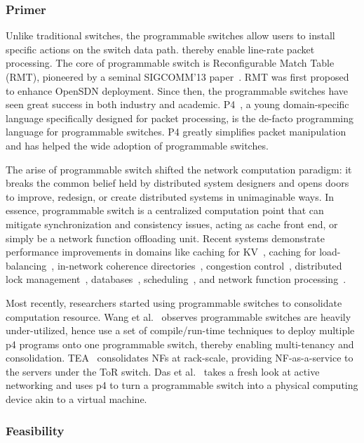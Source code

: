 \subsubsection{Primer}
Unlike traditional switches, the programmable switches
allow users to install specific actions on the switch data path.
thereby enable line-rate packet processing.
The core of programmable switch is Reconfigurable Match Table (RMT),
pioneered by a seminal SIGCOMM'13 paper~\cite{RMT-SIGCOMM13}.
RMT was first proposed to enhance OpenSDN deployment.
Since then, the programmable switches have seen great success in both industry and academic. 
P4~\cite{p4-paper}, a young domain-specific language specifically designed for packet processing, is the de-facto programming language for programmable switches. P4 greatly simplifies
packet manipulation and has helped the wide adoption of programmable switches.

The arise of programmable switch shifted the network computation paradigm:
it breaks the common belief held by distributed system designers
and opens doors to improve, redesign, or create distributed systems in unimaginable ways.
In essence, programmable switch is a centralized computation point
that can mitigate synchronization and consistency issues,
acting as cache front end, or simply be a network function offloading unit. 
Recent systems demonstrate performance improvements in domains like
caching for KV~\cite{netcache-sosp17, incbricks-asplos17},
caching for load-balancing~\cite{distcache-fast19},
in-network coherence directories~\cite{pegasus-osdi20},
congestion control~\cite{hpcc-sigcomm19},
distributed lock management~\cite{netlock-sigcomm20},
databases~\cite{cheetah-sigmod20},
scheduling~\cite{racksched-osdi20},
and network function processing~\cite{tea-sigcomm20}.

Most recently, researchers started using programmable switches
to consolidate computation resource.
Wang et al.~\cite{wang-hotcloud20} observes programmable switches are
heavily under-utilized, hence use a set of
compile/run-time techniques to deploy multiple p4 programs
onto one programmable switch, thereby enabling multi-tenancy and consolidation.
TEA~\cite{tea-sigcomm20} consolidates NFs at rack-scale,
providing NF-as-a-service to the servers under the ToR switch.
Das et al.~\cite{active-hotnets20} takes a fresh look at
active networking and uses p4 to turn a programmable switch
into a physical computing device akin to a virtual machine.

\subsubsection{Feasibility}


